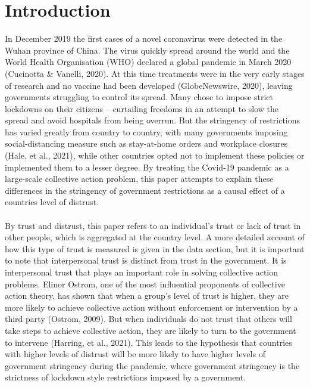 \documentclass[
  11pt,
]{article}
\begin{document}
\clearpage
\tableofcontents
{} 
\newpage
{}

\hypertarget{introduction}{%
\section{Introduction}\label{introduction}}

In December 2019 the first cases of a novel coronavirus were detected in the Wuhan province of China. The virus quickly spread around the world and the World Health Organisation (WHO) declared a global pandemic in March 2020 (Cucinotta \& Vanelli, 2020). At this time treatments were in the very early stages of research and no vaccine had been developed (GlobeNewswire, 2020), leaving governments struggling to control its spread. Many chose to impose strict lockdowns on their citizens -- curtailing freedoms in an attempt to slow the spread and avoid hospitals from being overrun. But the stringency of restrictions has varied greatly from country to country, with many governments imposing social-distancing measure such as stay-at-home orders and workplace closures (Hale, et al., 2021), while other countries opted not to implement these policies or implemented them to a lesser degree. By treating the Covid-19 pandemic as a large-scale collective action problem, this paper attempts to explain these differences in the stringency of government restrictions as a causal effect of a countries level of distrust.\\
~\\
By trust and distrust, this paper refers to an individual's trust or lack of trust in other people, which is aggregated at the country level. A more detailed account of how this type of trust is measured is given in the data section, but it is important to note that interpersonal trust is distinct from trust in the government. It is interpersonal trust that plays an important role in solving collective action problems. Elinor Ostrom, one of the most influential proponents of collective action theory, has shown that when a group's level of trust is higher, they are more likely to achieve collective action without enforcement or intervention by a third party (Ostrom, 2009). But when individuals do not trust that others will take steps to achieve collective action, they are likely to turn to the government to intervene (Harring, et al., 2021). This leads to the hypothesis that countries with higher levels of distrust will be more likely to have higher levels of government stringency during the pandemic, where government stringency is the strictness of lockdown style restrictions imposed by a government.\\
\end{document}
